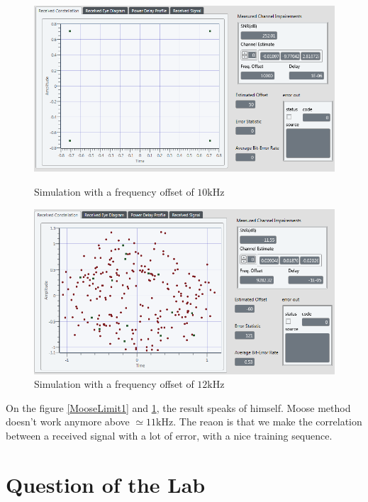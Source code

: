 \documentclass[frenchb, oneside, headings=normal]{scrartcl}
\begin{document}
\begin{figure}[!ht]
    \begin{minipage}[b]{0.48\linewidth}
        \centering \includegraphics[scale=0.45]{img/test_Offset_10k_OK_limitMooseCheck.png}
     \caption{Simulation with a frequency offset of $10 \si{\kilo\hertz}$}
     \label{MooseLimit1}
    \end{minipage}\hfill
    \begin{minipage}[b]{0.48\linewidth}
         \centering \includegraphics[scale=0.45]{img/test_Offset_12k_OK_limitMooseCheck.png}
\caption{Simulation with a frequency offset of $12 \si{\kilo\hertz}$}
 \label{MooseLimit2}
    \end{minipage}
\end{figure}

On the figure \ref{MooseLimit1} and \ref{MooseLimit2}, the result speaks of himself. Moose method doesn't work anymore above $\simeq 11 \si{\kilo\hertz}$. The reaon is that we make the correlation between a received signal with a lot of error, with a nice training sequence.

\section{Question of the Lab}
\end{document}
